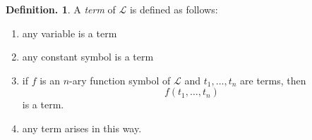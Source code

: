 \documentclass[a4paper,oneside,11pt,DIV=12,parskip=half]{scrartcl}
\theoremstyle{plain}
\theoremstyle{definition}
\newtheorem{definition}[theorem]{Definition.}
\newtheorem{remark, definition}[theorem]{Remark and Definition.}
\newtheorem{lemma, definition}[theorem]{Lemma and Definition.}
\newtheorem{theorem, definition}[theorem]{Theorem and Definition.}
\theoremstyle{remark}
\newtheorem*{remark, example}{\textbf{Remark and Exercise}}
\begin{document}
\begin{definition}
    A \emph{term} of $\mathcal{L}$ is defined as follows:
    \begin{enumerate}
        \item any variable is a term
        \item any constant symbol is a term
        \item if $f$ is an $n$-ary function symbol of $\mathcal{L}$ and $t_1,\dots,t_n$ are terms, then
        \[ f(t_1,\dots,t_n) \] is a term.
        \item any term arises in this way.
    \end{enumerate}
\end{definition}
\end{document}
